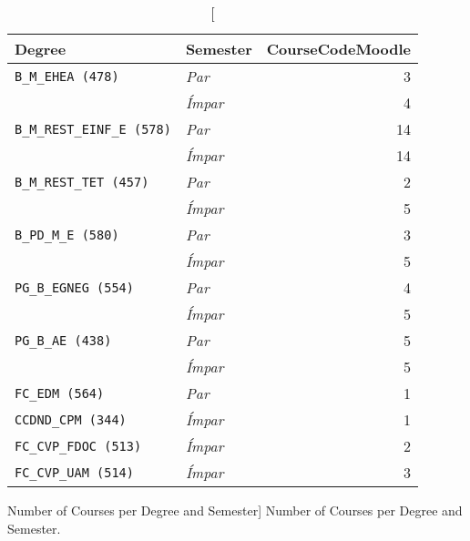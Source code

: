 \begin{table}[h!]
    \centering

    \begin{tabular}{l l r}
        Degree                             & Semester       & CourseCodeMoodle \\ \hline
        \texttt{B\_M\_EHEA (478)}          & \textit{Par}   & 3                \\
                                           & \textit{Ímpar} & 4                \\
        \texttt{B\_M\_REST\_EINF\_E (578)} & \textit{Par}   & 14               \\
                                           & \textit{Ímpar} & 14               \\
        \texttt{B\_M\_REST\_TET (457)}     & \textit{Par}   & 2                \\
                                           & \textit{Ímpar} & 5                \\
        \texttt{B\_PD\_M\_E (580)}         & \textit{Par}   & 3                \\
                                           & \textit{Ímpar} & 5                \\
        \texttt{PG\_B\_EGNEG (554)}        & \textit{Par}   & 4                \\
                                           & \textit{Ímpar} & 5                \\
        \texttt{PG\_B\_AE (438)}           & \textit{Par}   & 5                \\
                                           & \textit{Ímpar} & 5                \\
        \texttt{FC\_EDM (564)}             & \textit{Par}   & 1                \\
        \texttt{CCDND\_CPM (344)}          & \textit{Ímpar} & 1                \\
        \texttt{FC\_CVP\_FDOC (513)}       & \textit{Ímpar} & 2                \\
        \texttt{FC\_CVP\_UAM (514)}        & \textit{Ímpar} & 3                \\
    \end{tabular}

    \caption
        [Number of Courses per Degree and Semester]
        {Number of Courses per Degree and Semester.}

    \label{tab:stat_003_res_2}
\end{table}

